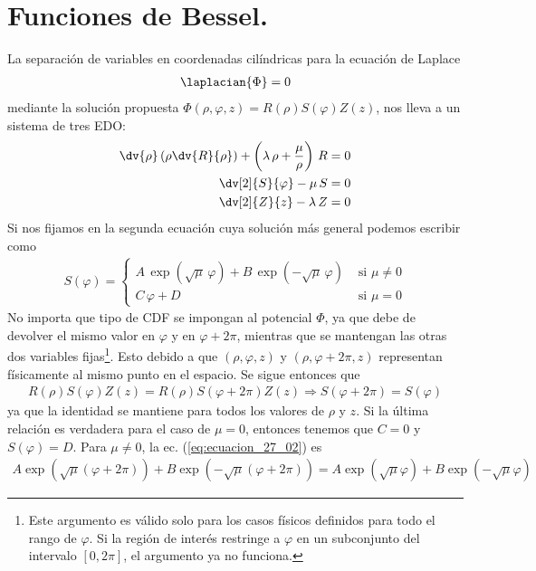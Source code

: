 \section{Funciones de Bessel.}
La separación de variables en coordenadas cilíndricas para la ecuación de Laplace
\begin{align*}
\laplacian{\Phi} = 0
\end{align*}
mediante la solución propuesta $\Phi (\rho, \varphi, z) = R(\rho) S(\varphi) Z(z)$, nos lleva a un sistema de tres EDO:
\begin{align}
\begin{aligned}
\dv{\rho} \left( \rho \dv{R}{\rho} \right) + \left( \lambda \, \rho + \dfrac{\mu}{\rho} \right) \, R &= 0 \\
\dv[2]{S}{\varphi} - \mu \, S &= 0 \\
\dv[2]{Z}{z} - \lambda \, Z &= 0
\end{aligned}
\label{eq:ecuacion_27_01}
\end{align}
Si nos fijamos en la segunda ecuación cuya solución más general podemos escribir como
\begin{align}
S (\varphi) = \begin{cases}
A \, \exp(\sqrt{\mu} \, \varphi) + B \, \exp(-\sqrt{\mu} \, \varphi) & \mbox{ si } \mu \neq 0 \\
C \,\varphi + D & \mbox { si } \mu = 0
\end{cases}
\label{eq:ecuacion_27_02}
\end{align}
No importa que tipo de CDF se impongan al potencial $\Phi$, ya que debe de devolver el mismo valor en $\varphi$ y en $\varphi + 2 \pi$, mientras que se mantengan las otras dos variables fijas\footnote{Este argumento es válido solo para los casos físicos definidos para todo el rango de $\varphi$. Si la región de interés restringe a $\varphi$ en un subconjunto del intervalo $[0, 2 \pi]$, el argumento ya no funciona.}. Esto debido a que $(\rho, \varphi, z)$ y $(\rho, \varphi + 2 \pi, z)$ representan físicamente al mismo punto en el espacio. Se sigue entonces que
\begin{align*}
R(\rho) S(\varphi) Z(z) = R(\rho) S(\varphi + 2 \pi) Z(z) \Longrightarrow S(\varphi + 2 \pi) = S (\varphi)
\end{align*}
ya que la identidad se mantiene para todos los valores de $\rho$ y $z$. Si la última relación es verdadera para el caso de $\mu = 0$, entonces tenemos que $C = 0$ y $S(\varphi) = D$. Para $\mu \neq 0$, la ec. (\ref{eq:ecuacion_27_02}) es
\begin{align*}
A \exp(\sqrt{\mu}(\varphi + 2 \pi)) + B \exp(- \sqrt{\mu}(\varphi + 2 \pi)) = A \exp(\sqrt{\mu} \varphi) + B \exp(-\sqrt{\mu} \varphi)
\end{align*}
